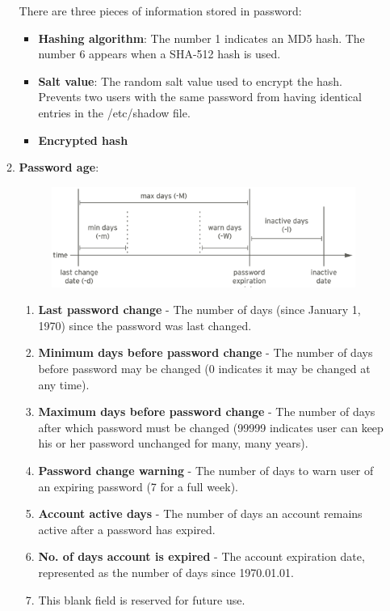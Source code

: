 \begin{flushleft}
\begin{itemize}
\begin{enumerate}
\begin{figure}[h!]
		\end{figure}
		There are three pieces of information stored in password:
		\begin{itemize}
			\item \textbf{Hashing algorithm}: The number 1 indicates an MD5 hash. The number 6 appears when a SHA-512 hash is used.
			\item \textbf{Salt value}: The random salt value used to encrypt the hash. Prevents two users with the same password from having identical entries in the /etc/shadow file.
			\item \textbf{Encrypted hash}
		\end{itemize}
		\bigskip
		\bigskip
		\item \textbf{Password age}:
		\begin{figure}[h!]
			\centering
			\includegraphics[scale=.2]{content/chapter4/images/age.png}
		\end{figure}
		\begin{enumerate}\addtocounter{enumi}{3}
			\item \textbf{Last password change} - The number of days (since January 1, 1970) since the password was last changed.
			\item \textbf{Minimum days before password change} - The number of days before password may be changed (0 indicates it may be changed at any time).
			\item \textbf{Maximum days before password change} - The number of days after which password must be changed (99999 indicates user can keep his or her password unchanged for many, many years).
			\item \textbf{Password change warning} - The number of days to warn user of an expiring password (7 for a full week).
			\item \textbf{Account active days} - The number of days an account remains active after a password has expired.
			\item \textbf{No. of days account is expired} - The account expiration date, represented as the number of days since 1970.01.01.
			\item This blank field is reserved for future use.
		\end{enumerate}
	\end{enumerate}
\end{itemize}	
	

\end{flushleft}
